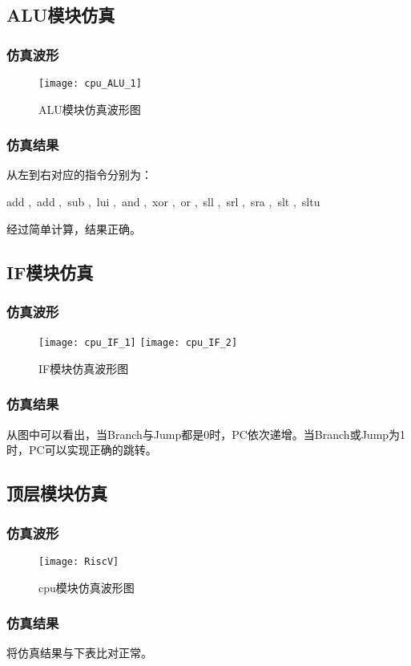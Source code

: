 \documentclass{../source/Experiment}
\begin{document}
\subsection{ALU模块仿真}
\subsubsection{仿真波形}
\begin{figure}[H]
    \centering
    \texttt{[image: cpu\_ALU\_1]}
    \caption{ALU模块仿真波形图}
\end{figure}
\subsubsection{仿真结果}
从左到右对应的指令分别为：

add ,\,  add ,\,  sub ,\,  lui ,\,  and ,\,  xor ,\,  or ,\,  sll ,\,  srl ,\,  sra ,\,  slt ,\,  sltu

经过简单计算，结果正确。

\subsection{IF模块仿真}
\subsubsection{仿真波形}
\begin{figure}[H]
    \centering
    \texttt{[image: cpu\_IF\_1]}
    \texttt{[image: cpu\_IF\_2]}
    \caption{IF模块仿真波形图}
\end{figure}
\subsubsection{仿真结果}
从图中可以看出，当Branch与Jump都是0时，PC依次递增。当Branch或Jump为1时，PC可以实现正确的跳转。

\subsection{顶层模块仿真}
\subsubsection{仿真波形}
\begin{figure}[H]
    \centering
    \texttt{[image: RiscV]}
    \caption{cpu模块仿真波形图}
\end{figure}
\subsubsection{仿真结果}
将仿真结果与下表比对正常。
\end{document}
